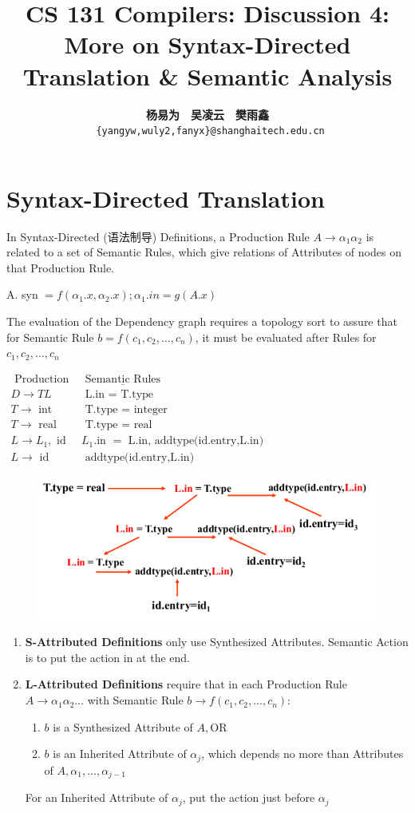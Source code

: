 \documentclass[a4paper]{exam}
\title{CS 131 Compilers: Discussion 4: More on Syntax-Directed Translation \& Semantic Analysis}
\author{\textbf{杨易为}~~\textbf{吴凌云}~~\textbf{樊雨鑫} \\ \texttt{ \{yangyw,wuly2,fanyx\}@shanghaitech.edu.cn}}
\begin{document}
\maketitle
\section{Syntax-Directed Translation}
In Syntax-Directed (语法制导) Definitions, a Production Rule $A \rightarrow \alpha_{1} \alpha_{2}$ is related to a set of Semantic Rules, which give relations of Attributes of nodes on that Production Rule.

A. syn $=f\left(\alpha_{1} . x, \alpha_{2} . x\right) ; \alpha_{1} . i n=g(A . x)$

The evaluation of the Dependency graph requires a topology sort to assure that for Semantic Rule $b=f\left(c_{1}, c_{2}, \ldots, c_{n}\right)$, it must be evaluated after Rules for $c_{1}, c_{2}, \ldots, c_{n}$

$\begin{array}{ll}\text { Production } & \underline{\text { Semantic Rules }} \\ {D} \rightarrow T L & \text { L.in = T.type } \\ T \rightarrow \text { int } & \text { T.type = integer } \\ T \rightarrow \text { real } & \text { T.type = real } \\L \rightarrow L_{1}, \text { id } & L_{1}. \text {in }=\text { L.in, addtype(id.entry,L.in) } \\ L \rightarrow \text { id } & \text { addtype(id.entry,L.in) }\end{array}$

\begin{figure}[htbp]
  \centering
  \includegraphics[width=0.4\columnwidth]{./img/CSc.png}
\end{figure}
\begin{enumerate}
  \item \textbf{S-Attributed Definitions} only use Synthesized Attributes. Semantic Action is to put the action in at the end.
  \item \textbf{L-Attributed Definitions} require that in each Production Rule $A \rightarrow \alpha_{1} \alpha_{2} \ldots$ with Semantic Rule $b \rightarrow f\left(c_{1}, c_{2}, \ldots, c_{n}\right):$
        \begin{enumerate}
          \item $b$ is a Synthesized Attribute of $A, \mathrm{OR}$
          \item $b$ is an Inherited Attribute of $\alpha_{j}$, which depends no more than Attributes of $A, \alpha_{1}, \ldots, \alpha_{j-1}$
        \end{enumerate}
        For an Inherited Attribute of $\alpha_{j}$, put the action just before $\alpha_{j}$
\end{enumerate}
\end{document}
